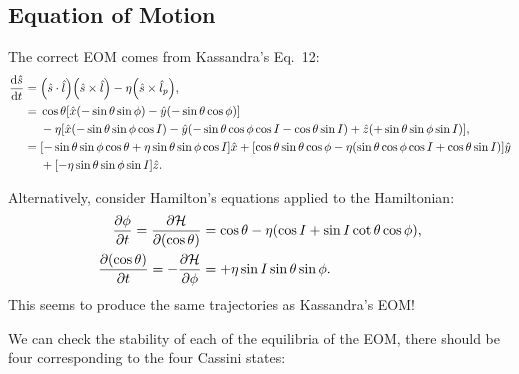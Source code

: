 \documentclass[11pt,
        usenames, %
        dvipsnames %
    ]{article}
\newcommand*{\rd}[2]{\frac{\mathrm{d}#1}{\mathrm{d}#2}}
\newcommand*{\pd}[2]{\frac{\partial#1}{\partial#2}}
\DeclarePairedDelimiter\p{\lparen}{\rparen}
\DeclarePairedDelimiter\s{\lbrack}{\rbrack}
\begin{document}
\subsection{Equation of Motion}

The correct EOM comes from Kassandra's Eq.\ 12:
\begin{align*}
    \rd{\hat{s}}{t} ={}&
        \p*{\hat{s} \cdot \hat{l}}\p*{\hat{s} \times \hat{l}}
            -\eta\p*{\hat{s} \times \hat{l}_p},\\
        ={}& \cos\theta \s*{
            \hat{x}\p*{-\sin\theta \sin\phi}
            - \hat{y}\p*{-\sin\theta \cos\phi}}\\
            &- \eta \s*{
                \hat{x}\p*{-\sin\theta \sin \phi \cos I}
                - \hat{y}\p*{-\sin \theta \cos \phi \cos I
                    - \cos \theta\sin I}
                + \hat{z}\p*{+\sin\theta \sin \phi \sin I}},\\
        ={}& \s*{-\sin\theta \sin\phi \cos\theta
            + \eta \sin \theta \sin \phi \cos I}\hat{x}
            + \s*{\cos\theta \sin\theta \cos\phi
                - \eta\p*{\sin\theta \cos\phi \cos I
                    + \cos\theta \sin I}}\hat{y}\\
            &+ \s*{-\eta\sin\theta \sin\phi \sin I}\hat{z}.
\end{align*}

Alternatively, consider Hamilton's equations applied to the Hamiltonian:
\begin{align}
    \pd{\phi}{t} = \pd{\mathcal{H}}{(\cos\theta)}
        &= \cos\theta - \eta\p*{\cos I + \sin I \cot \theta \cos \phi},\\
    \pd{(\cos \theta)}{t} = -\pd{\mathcal{H}}{\phi}
        &= +\eta \sin I \sin \theta \sin \phi.
\end{align}
This seems to produce the same trajectories as Kassandra's EOM\@!

We can check the stability of each of the equilibria of the EOM, there should be
four corresponding to the four Cassini states:
\end{document}
